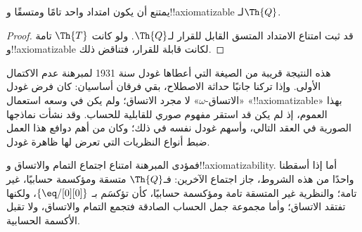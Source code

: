 \documentclass[../../../include/open-logic-section]{subfiles}
\begin{document}


\begin{thm}
يمتنع أن يكون امتداد واحد تامًا ومتسقًا و!!{axiomatizable}
لـ$\Th{Q}$.
\end{thm}

\begin{proof}
قد ثبت امتناع الامتداد المتسق القابل للقرار لـ$\Th{Q}$.
ولو كانت $\Th{T}$ تامة و!!{axiomatizable} لكانت قابلة للقرار،
فتناقض ذلك.
\end{proof}

\begin{explain}
هذه النتيجة قريبة من الصيغة التي أعطاها غودل سنة 1931 لمبرهنة
عدم الاكتمال الأولى. وإذا تركنا جانبًا حداثة الاصطلاح، بقي فرقان
أساسيان: كان فرض غودل «الاتساق-$\omega$» لا مجرد الاتساق؛ ولم يكن
في وسعه استعمال «!!{axiomatizable}» بهذا العموم، إذ لم يكن قد
استقر مفهوم صوري للقابلية للحساب. وقد نشأت نماذجها الصورية في العقد
التالي، وأسهم غودل نفسه في ذلك؛ وكان من أهم دوافع هذا العمل ضبط
أنواع النظريات التي تعرض لها ظاهرة غودل.

فمؤدى المبرهنة امتناع اجتماع التمام والاتساق
و!!{axiomatizability}. أما إذا أسقطنا واحدًا من هذه الشروط، جاز
اجتماع الآخرين: فـ$\Th{Q}$ متسقة ومؤكسمة حسابيًا، غير تامة؛
والنظرية غير المتسقة تامة ومؤكسمة حسابيًا، كأن تؤكسَم بـ
$\{ \eq/[0][0] \}$، ولكنها تفتقد الاتساق؛ وأما مجموعة جمل الحساب
الصادقة فتجمع التمام والاتساق، ولا تقبل الأكسمة الحسابية.
\end{explain}
\end{document}
